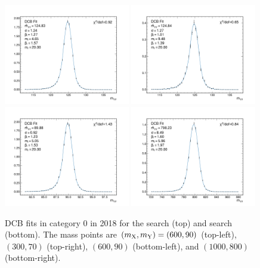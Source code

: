 \begin{figure}
  \centering
  \includegraphics[width=0.49\textwidth]{Figures/Dihiggs/signal/tautau_mx_600_my_90.pdf}
  \includegraphics[width=0.49\textwidth]{Figures/Dihiggs/signal/tautau_mx_300_my_70.pdf} \\
  \includegraphics[width=0.49\textwidth]{Figures/Dihiggs/signal/low_mass_mx_600_my_90.pdf}
  \includegraphics[width=0.49\textwidth]{Figures/Dihiggs/signal/high_mass_mx_1000_my_800.pdf}
  \caption[DCB Signal Fits in \XYH Searches]{DCB fits in category 0 in 2018 for the \XYttHgg search (top) and \XYggHtt search (bottom). The mass points are $(m_{\mathrm{X}},m_{\mathrm{Y}})=(600,90)$ (top-left), $(300,70)$ (top-right), $(600,90)$ (bottom-left), and $(1000,800)$\GeV (bottom-right).}\label{fig:dcb_fits}
\end{figure}

